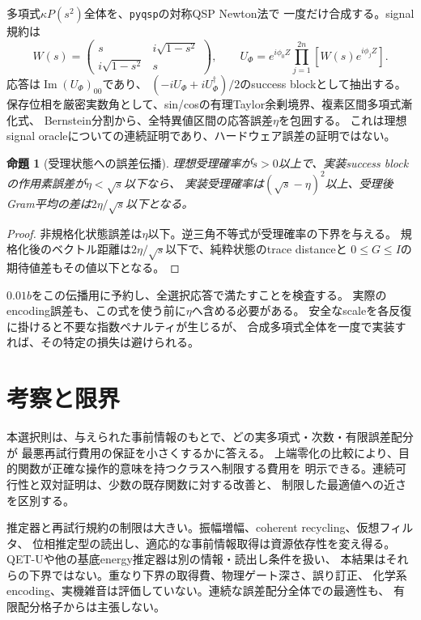\documentclass[11pt,a4paper]{article}
\newtheorem{proposition}[theorem]{命題}
\begin{document}
多項式$\kappa P(s^2)$全体を、\texttt{pyqsp}の対称QSP Newton法\cite{Symmetric}で
一度だけ合成する。signal規約は
\[
 W(s)=\begin{pmatrix}s&i\sqrt{1-s^2}\\i\sqrt{1-s^2}&s\end{pmatrix},\qquad
 U_\Phi=e^{i\phi_0Z}\prod_{j=1}^{2n}[W(s)e^{i\phi_jZ}].
\]
応答は$\operatorname{Im}(U_\Phi)_{00}$であり、
$(-iU_\Phi+iU_\Phi^\dagger)/2$のsuccess blockとして抽出する。
保存位相を厳密実数角として、sin/cosの有理Taylor余剰境界、複素区間多項式漸化式、
Bernstein分割から、全特異値区間の応答誤差$\eta$を包囲する。
これは理想signal oracleについての連続証明であり、ハードウェア誤差の証明ではない。

\begin{proposition}[受理状態への誤差伝播]\label{prop:phase}
理想受理確率が$s>0$以上で、実装success blockの作用素誤差が$\eta<\sqrt s$以下なら、
実装受理確率は$(\sqrt s-\eta)^2$以上、受理後Gram平均の差は$2\eta/\sqrt s$以下となる。
\end{proposition}
\begin{proof}
非規格化状態誤差は$\eta$以下。逆三角不等式が受理確率の下界を与える。
規格化後のベクトル距離は$2\eta/\sqrt s$以下で、純粋状態のtrace distanceと
$0\leq G\leq I$の期待値差もその値以下となる。
\end{proof}
$0.01b$をこの伝播用に予約し、全選択応答で満たすことを検査する。
実際のencoding誤差も、この式を使う前に$\eta$へ含める必要がある。
安全なscaleを各反復に掛けると不要な指数ペナルティが生じるが、
合成多項式全体を一度で実装すれば、その特定の損失は避けられる。





\section{考察と限界}
本選択則は、与えられた事前情報のもとで、どの実多項式・次数・有限誤差配分が
最悪再試行費用の保証を小さくするかに答える。
上端零化の比較により、目的関数が正確な操作的意味を持つクラスへ制限する費用を
明示できる。連続可行性と双対証明は、少数の既存関数に対する改善と、
制限した最適値への近さを区別する。

推定器と再試行規約の制限は大きい。振幅増幅、coherent recycling、仮想フィルタ、
位相推定型の読出し、適応的な事前情報取得は資源依存性を変え得る。
QET-Uや他の基底energy推定器は別の情報・読出し条件を扱い\cite{QETU,Accurate}、
本結果はそれらの下界ではない。重なり下界の取得費、物理ゲート深さ、誤り訂正、
化学系encoding、実機雑音は評価していない。連続な誤差配分全体での最適性も、
有限配分格子からは主張しない。
\end{document}
